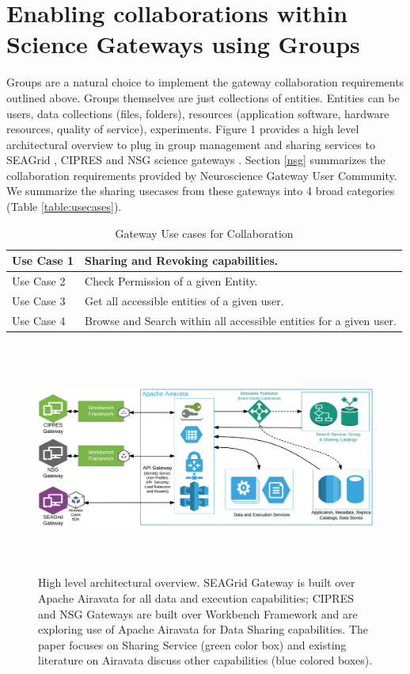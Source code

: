 \documentclass[sigconf]{acmart}
\begin{document}
\section{Enabling collaborations within Science Gateways using Groups}

Groups are a natural choice to implement the gateway collaboration requirements outlined above. Groups themselves are just collections of entities. Entities can be  users, data collections (files, folders), resources (application software, hardware resources, quality of service), experiments. Figure 1 provides a high level architectural overview to plug in group management and sharing services to SEAGrid \cite{seagridCommunity2016}, CIPRES \cite{cipres2010} and NSG science gateways \cite{nsg2013}. Section \ref{nsg} summarizes the collaboration requirements provided by Neuroscience Gateway User Community. We summarize the sharing usecases from these gateways into 4 broad categories (Table \ref{table:usecases}). 

\begin{table}
\begin{tabular}{ |p{2cm}|p{6cm}| }
\hline
Use Case 1 & Sharing and Revoking capabilities.\\
\hline
Use Case 2 & Check Permission of a given Entity.\\
\hline
Use Case 3 & Get all accessible entities of a given user.\\
\hline
Use Case 4 & Browse and Search within all accessible entities for a given user.\\
\hline
\end{tabular}
\caption{Gateway Use cases for Collaboration}
\end{table}\label{table:usecases}

\begin{figure}
\includegraphics[height=3in, width=7in]{figures/gateway-integaration-overview.pdf}
\caption{High level architectural overview. SEAGrid Gateway is built over Apache Airavata for all data and execution capabilities; CIPRES and NSG Gateways are built over Workbench Framework and are exploring use of Apache Airavata for Data Sharing capabilities. The paper focuses on Sharing Service (green color box) and existing literature on Airavata discuss other capabilities (blue colored boxes).}
\end{figure}
\end{document}
